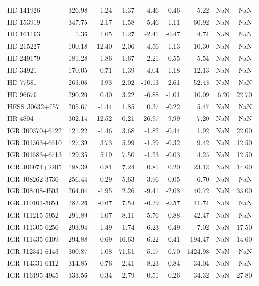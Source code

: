 \documentclass{article}%
\begin{document}
\begin{longtable}{lrrrrrrrr}
HD 141926 & 326.98 & -1.24 & 1.37 & -4.46 & -0.46 & 5.22 & NaN & NaN \\
HD 153919 & 347.75 & 2.17 & 1.58 & 5.46 & 1.11 & 60.92 & NaN & NaN \\
HD 161103 & 1.36 & 1.05 & 1.27 & -2.41 & -0.47 & 4.74 & NaN & NaN \\
HD 215227 & 100.18 & -12.40 & 2.06 & -4.56 & -1.13 & 10.30 & NaN & NaN \\
HD 249179 & 181.28 & 1.86 & 1.67 & 2.21 & -0.55 & 5.54 & NaN & NaN \\
HD 34921 & 170.05 & 0.71 & 1.39 & 4.04 & -1.18 & 12.13 & NaN & NaN \\
HD 77581 & 263.06 & 3.93 & 2.02 & -10.13 & 2.61 & 52.43 & NaN & NaN \\
HD 96670 & 290.20 & 0.40 & 3.22 & -6.88 & -1.01 & 10.09 & 6.20 & 22.70 \\
HESS J0632+057 & 205.67 & -1.44 & 1.85 & 0.37 & -0.22 & 5.47 & NaN & NaN \\
HR 4804 & 302.14 & -12.52 & 0.21 & -26.97 & -9.99 & 7.20 & NaN & NaN \\
IGR J00370+6122 & 121.22 & -1.46 & 3.68 & -1.82 & -0.44 & 1.92 & NaN & 22.00 \\
IGR J01363+6610 & 127.39 & 3.73 & 5.99 & -1.59 & -0.32 & 9.42 & NaN & 12.50 \\
IGR J01583+6713 & 129.35 & 5.19 & 7.50 & -1.23 & -0.03 & 4.25 & NaN & 12.50 \\
IGR J06074+2205 & 188.39 & 0.81 & 7.24 & 0.81 & 0.20 & 23.13 & NaN & 14.60 \\
IGR J08262-3736 & 256.44 & 0.29 & 5.63 & -3.96 & -0.05 & 6.70 & NaN & NaN \\
IGR J08408-4503 & 264.04 & -1.95 & 2.26 & -9.41 & -2.08 & 40.72 & NaN & 33.00 \\
IGR J10101-5654 & 282.26 & -0.67 & 7.54 & -6.29 & -0.57 & 41.74 & NaN & NaN \\
IGR J11215-5952 & 291.89 & 1.07 & 8.11 & -5.76 & 0.88 & 42.47 & NaN & NaN \\
IGR J11305-6256 & 293.94 & -1.49 & 1.74 & -6.23 & -0.49 & 7.02 & NaN & 17.50 \\
IGR J11435-6109 & 294.88 & 0.69 & 16.63 & -6.22 & -0.41 & 194.47 & NaN & 14.60 \\
IGR J12341-6143 & 300.87 & 1.08 & 71.51 & -5.17 & 0.70 & 1424.98 & NaN & NaN \\
IGR J14331-6112 & 314.85 & -0.76 & 2.41 & -8.23 & -0.84 & 34.04 & NaN & NaN \\
IGR J16195-4945 & 333.56 & 0.34 & 2.79 & -0.51 & -0.26 & 34.32 & NaN & 27.80 \\

\end{longtable}
\end{document}
